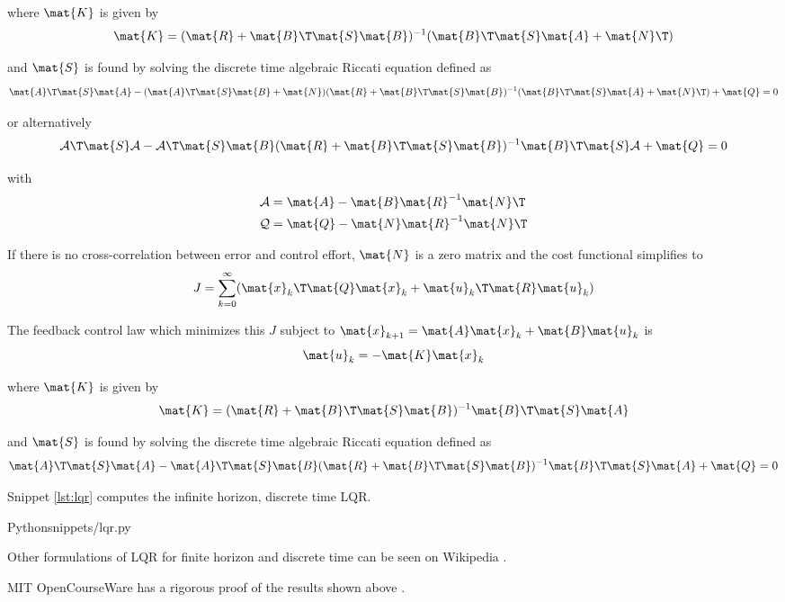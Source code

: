 where $\mat{K}$ is given by
\begin{equation*}
  \mat{K} = (\mat{R} + \mat{B}\T\mat{S}\mat{B})^{-1}
    (\mat{B}\T\mat{S}\mat{A} + \mat{N}\T)
\end{equation*}

and $\mat{S}$ is found by solving the discrete time algebraic Riccati equation
defined as
\begin{equation*}
  \mat{A}\T\mat{S}\mat{A} - (\mat{A}\T\mat{S}\mat{B} + \mat{N})
    (\mat{R} + \mat{B}\T\mat{S}\mat{B})^{-1}
    (\mat{B}\T\mat{S}\mat{A} + \mat{N}\T) + \mat{Q} = 0
\end{equation*}

or alternatively
\begin{equation*}
  \mathcal{A}\T\mat{S}\mathcal{A} - \mathcal{A}\T\mat{S}\mat{B}
    (\mat{R} + \mat{B}\T\mat{S}\mat{B})^{-1} \mat{B}\T\mat{S}\mathcal{A} +
    \mat{Q} = 0
\end{equation*}

with
\begin{align*}
  \mathcal{A} &= \mat{A} - \mat{B}\mat{R}^{-1}\mat{N}\T \\
  \mathcal{Q} &= \mat{Q} - \mat{N}\mat{R}^{-1}\mat{N}\T
\end{align*}

If there is no cross-correlation between \gls{error} and \gls{control effort},
$\mat{N}$ is a zero matrix and the cost functional simplifies to
\begin{equation*}
  J = \sum_{k=0}^\infty (\mat{x}_k\T\mat{Q}\mat{x}_k +
    \mat{u}_k\T\mat{R}\mat{u}_k)
\end{equation*}

The feedback \gls{control law} which minimizes this $J$ subject to
$\mat{x}_{k+1} = \mat{A}\mat{x}_k + \mat{B}\mat{u}_k$ is
\begin{equation*}
  \mat{u}_k = -\mat{K}\mat{x}_k
\end{equation*}

where $\mat{K}$ is given by
\begin{equation*}
  \mat{K} = (\mat{R} + \mat{B}\T\mat{S}\mat{B})^{-1} \mat{B}\T\mat{S}\mat{A}
\end{equation*}

and $\mat{S}$ is found by solving the discrete time algebraic Riccati equation
defined as
\begin{equation*}
  \mat{A}\T\mat{S}\mat{A} - \mat{A}\T\mat{S}\mat{B}
    (\mat{R} + \mat{B}\T\mat{S}\mat{B})^{-1} \mat{B}\T\mat{S}\mat{A} +
    \mat{Q} = 0
\end{equation*}

Snippet \ref{lst:lqr} computes the infinite horizon, discrete time LQR.
\begin{coderemote}{Python}{snippets/lqr.py}
  \caption{Infinite horizon, discrete time LQR computation in Python}
  \label{lst:lqr}
\end{coderemote}

Other formulations of LQR for finite horizon and discrete time can be seen on
Wikipedia \cite{bib:wiki_lqr}.

MIT OpenCourseWare has a rigorous proof of the results shown above
\cite{bib:lqr_derivs}.
